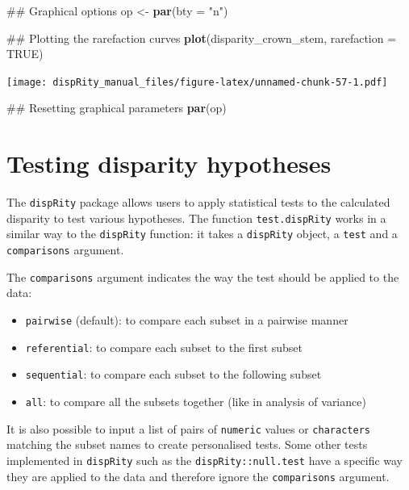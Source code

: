 \documentclass[]{book}
\newenvironment{Shaded}{\begin{snugshade}}{\end{snugshade}}
\newcommand{\KeywordTok}[1]{\textcolor[rgb]{0.13,0.29,0.53}{\textbf{#1}}}
\newcommand{\DataTypeTok}[1]{\textcolor[rgb]{0.13,0.29,0.53}{#1}}
\newcommand{\StringTok}[1]{\textcolor[rgb]{0.31,0.60,0.02}{#1}}
\newcommand{\OtherTok}[1]{\textcolor[rgb]{0.56,0.35,0.01}{#1}}
\newcommand{\NormalTok}[1]{#1}
\providecommand{\tightlist}{%
  \setlength{\itemsep}{0pt}\setlength{\parskip}{0pt}}
\theoremstyle{definition}
\theoremstyle{definition}
\theoremstyle{remark}
\begin{document}
\begin{Shaded}
\begin{Highlighting}[]
\NormalTok{## Graphical options}
\NormalTok{op <-}\StringTok{ }\KeywordTok{par}\NormalTok{(}\DataTypeTok{bty =} \StringTok{"n"}\NormalTok{)}

\NormalTok{## Plotting the rarefaction curves}
\KeywordTok{plot}\NormalTok{(disparity_crown_stem, }\DataTypeTok{rarefaction =} \OtherTok{TRUE}\NormalTok{)}
\end{Highlighting}
\end{Shaded}

\texttt{[image: dispRity\_manual\_files/figure-latex/unnamed-chunk-57-1.pdf]}

\begin{Shaded}
\begin{Highlighting}[]
\NormalTok{## Resetting graphical parameters}
\KeywordTok{par}\NormalTok{(op)}
\end{Highlighting}
\end{Shaded}

\section{Testing disparity
hypotheses}\label{testing-disparity-hypotheses}

The \texttt{dispRity} package allows users to apply statistical tests to
the calculated disparity to test various hypotheses. The function
\texttt{test.dispRity} works in a similar way to the \texttt{dispRity}
function: it takes a \texttt{dispRity} object, a \texttt{test} and a
\texttt{comparisons} argument.

The \texttt{comparisons} argument indicates the way the test should be
applied to the data:

\begin{itemize}
\tightlist
\item
  \texttt{pairwise} (default): to compare each subset in a pairwise
  manner
\item
  \texttt{referential}: to compare each subset to the first subset
\item
  \texttt{sequential}: to compare each subset to the following subset
\item
  \texttt{all}: to compare all the subsets together (like in analysis of
  variance)
\end{itemize}

It is also possible to input a list of pairs of \texttt{numeric} values
or \texttt{characters} matching the subset names to create personalised
tests. Some other tests implemented in \texttt{dispRity} such as the
\texttt{dispRity::null.test} have a specific way they are applied to the
data and therefore ignore the \texttt{comparisons} argument.
\end{document}
